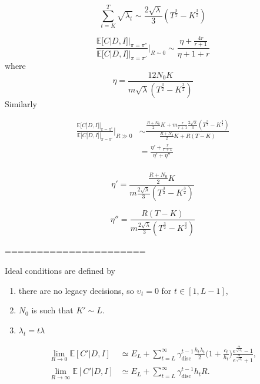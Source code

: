 \begin{equation}
	\sum_{t=K}^{T}\sqrt{\lambda_t}\sim \frac{2\sqrt{\lambda}}{3}(T^\frac{3}{2}-K^\frac{3}{2})
\end{equation}

\begin{equation}
	\frac{\mathbb{E}[C|D,I]|_{\pi = \pi^*} }{\mathbb{E}[C|D,I]|_{\pi = \pi'}}\bigg|_{R\sim 0}\sim \frac{\eta+\frac{4r}{r+1}}{\eta+1+r}
\end{equation}
where
\begin{equation}
	\eta = \frac{12N_0K}{m\sqrt{\lambda}(T^\frac{3}{2}-K^\frac{3}{2})}
\end{equation}
Similarly


\begin{equation}
	\begin{split}
		\frac{\mathbb{E}[C|D,I]|_{\pi = \pi^*} }{\mathbb{E}[C|D,I]|_{\pi = \pi'}}\bigg|_{R\gg 0}&\sim \frac{\frac{R+N_0}{2}K+m\frac{r}{r+1}\frac{2\sqrt{\lambda}}{3}(T^\frac{3}{2}-K^\frac{3}{2})}{\frac{R+N_0}{2}K+R(T-K)}\\
		& = \frac{\eta'+\frac{r}{r+1}}{\eta'+\eta''}\\
	\end{split}
\end{equation}

\begin{equation}
	\eta' = \frac{\frac{R+N_0}{2}K}{m\frac{2\sqrt{\lambda}}{3}(T^\frac{3}{2}-K^\frac{3}{2})}
\end{equation}

\begin{equation}
	\eta'' = \frac{R(T-K)}{m\frac{2\sqrt{\lambda}}{3}(T^\frac{3}{2}-K^\frac{3}{2})}
\end{equation}

======================






\begin{axiom}
	Ideal conditions are defined by
	\begin{enumerate}
		\item there are no legacy decisions, so $\upsilon_t=0$ for $t\in [1,L-1]$,
		\item $N_0$ is such that $K'\sim L$.
		\item $\lambda_t=t\lambda$
	\end{enumerate}
\end{axiom}

\begin{equation}
	\begin{split}
		\lim\limits_{R\rightarrow 0} \mathbb{E}[C'|D,I] & \simeq E_L+\sum_{t=L}^{\infty} \gamma_{\text{disc}}^{t-1}\frac{h_t\lambda_t}{2}\bigg(1+\frac{c_t}{h_t}\bigg)  
		\frac{e^{\frac{m}{\sqrt{\lambda_t}}}-1}{e^{\frac{m}{\sqrt{\lambda_t}}}+1},\\
		\lim\limits_{R\rightarrow \infty} \mathbb{E}[C'|D,I] & \simeq E_L+\sum_{t=L}^{\infty} \gamma_{\text{disc}}^{t-1} 
		h_tR.\\
	\end{split}
\end{equation}






